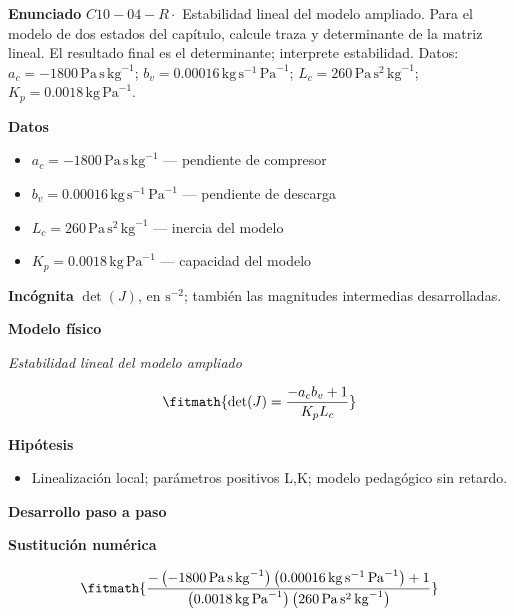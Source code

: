 \documentclass[10pt,openany]{book}
\begin{document}
\begin{tcolorbox}[title={Problema resuelto 4}, studiumworked, breakable]

\noindent\textbf{Enunciado}
\(C10-04-R \cdot\) Estabilidad lineal del modelo ampliado. Para el modelo de dos estados del capítulo, calcule traza y determinante de la matriz lineal. El resultado final es el determinante; interprete estabilidad. Datos: \(a_c=-1800\, \mathrm{Pa}\,\mathrm{s}\,\mathrm{kg}^{-1}\); \(b_v=0.00016\, \mathrm{kg}\,\mathrm{s}^{-1}\,\mathrm{Pa}^{-1}\); \(L_c=260\, \mathrm{Pa}\,\mathrm{s}^{2}\,\mathrm{kg}^{-1}\); \(K_p=0.0018\, \mathrm{kg}\,\mathrm{Pa}^{-1}\).

\noindent\textbf{Datos}
\begin{itemize}
\item $a_c = -1800\,\mathrm{Pa}\,\mathrm{s}\,\mathrm{kg}^{-1}$ — pendiente de compresor
\item $b_v = 0.00016\,\mathrm{kg}\,\mathrm{s}^{-1}\,\mathrm{Pa}^{-1}$ — pendiente de descarga
\item $L_c = 260\,\mathrm{Pa}\,\mathrm{s}^{2}\,\mathrm{kg}^{-1}$ — inercia del modelo
\item $K_p = 0.0018\,\mathrm{kg}\,\mathrm{Pa}^{-1}$ — capacidad del modelo
\end{itemize}

\noindent\textbf{Incógnita}
$\det(J)$, en $\mathrm{s^{-2}}$; también las magnitudes intermedias desarrolladas.

\noindent\textbf{Modelo físico}

\noindent\textit{Estabilidad lineal del modelo ampliado}

\[
\fitmath{\det(J)=\frac{- a_c b_v + 1}{K_p L_c}}
\]

\noindent\textbf{Hipótesis}
\begin{itemize}
\item Linealización local; parámetros positivos L,K; modelo pedagógico sin retardo.
\end{itemize}

\noindent\textbf{Desarrollo paso a paso}



\noindent\textbf{Sustitución numérica}

\[
\fitmath{\frac{- \left(-1800\,\mathrm{Pa}\,\mathrm{s}\,\mathrm{kg}^{-1}\right) \left(0.00016\,\mathrm{kg}\,\mathrm{s}^{-1}\,\mathrm{Pa}^{-1}\right) + 1}{\left(0.0018\,\mathrm{kg}\,\mathrm{Pa}^{-1}\right) \left(260\,\mathrm{Pa}\,\mathrm{s}^{2}\,\mathrm{kg}^{-1}\right)}}
\]


\end{tcolorbox}
\end{document}
